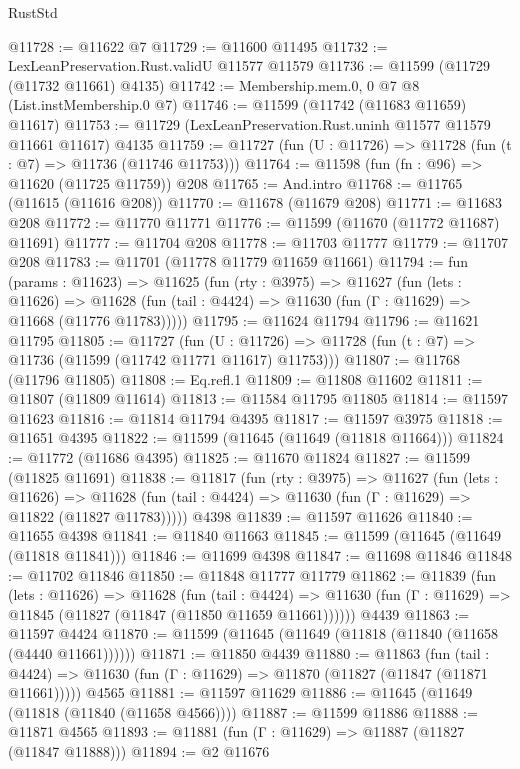 \begin{lexlean}{RustStd}
\begin{coremodule}
@11728 := @11622 @7
@11729 := @11600 @11495
@11732 := LexLeanPreservation.Rust.validU @11577 @11579
@11736 := @11599 (@11729 (@11732 @11661) @4135)
@11742 := Membership.mem.{0, 0} @7 @8 (List.instMembership.{0} @7)
@11746 := @11599 (@11742 (@11683 @11659) @11617)
@11753 := @11729 (LexLeanPreservation.Rust.uninh @11577 @11579 @11661 @11617) @4135
@11759 := @11727 (fun (U : @11726) => @11728 (fun (t : @7) => @11736 (@11746 @11753)))
@11764 := @11598 (fun (fn : @96) => @11620 (@11725 @11759)) @208
@11765 := And.intro
@11768 := @11765 (@11615 (@11616 @208))
@11770 := @11678 (@11679 @208)
@11771 := @11683 @208
@11772 := @11770 @11771
@11776 := @11599 (@11670 (@11772 @11687) @11691)
@11777 := @11704 @208
@11778 := @11703 @11777
@11779 := @11707 @208
@11783 := @11701 (@11778 @11779 @11659 @11661)
@11794 := fun (params : @11623) =>
  @11625
    (fun (rty : @3975) =>
    @11627
      (fun (lets : @11626) =>
      @11628 (fun (tail : @4424) => @11630 (fun (Γ : @11629) => @11668 (@11776 @11783)))))
@11795 := @11624 @11794
@11796 := @11621 @11795
@11805 := @11727
    (fun (U : @11726) => @11728 (fun (t : @7) => @11736 (@11599 (@11742 @11771 @11617) @11753)))
@11807 := @11768 (@11796 @11805)
@11808 := Eq.refl.{1}
@11809 := @11808 @11602
@11811 := @11807 (@11809 @11614)
@11813 := @11584 @11795 @11805
@11814 := @11597 @11623
@11816 := @11814 @11794 @4395
@11817 := @11597 @3975
@11818 := @11651 @4395
@11822 := @11599 (@11645 (@11649 (@11818 @11664)))
@11824 := @11772 (@11686 @4395)
@11825 := @11670 @11824
@11827 := @11599 (@11825 @11691)
@11838 := @11817
    (fun (rty : @3975) =>
    @11627
      (fun (lets : @11626) =>
      @11628 (fun (tail : @4424) => @11630 (fun (Γ : @11629) => @11822 (@11827 @11783)))))
    @4398
@11839 := @11597 @11626
@11840 := @11655 @4398
@11841 := @11840 @11663
@11845 := @11599 (@11645 (@11649 (@11818 @11841)))
@11846 := @11699 @4398
@11847 := @11698 @11846
@11848 := @11702 @11846
@11850 := @11848 @11777 @11779
@11862 := @11839
    (fun (lets : @11626) =>
    @11628
      (fun (tail : @4424) =>
      @11630 (fun (Γ : @11629) => @11845 (@11827 (@11847 (@11850 @11659 @11661))))))
    @4439
@11863 := @11597 @4424
@11870 := @11599 (@11645 (@11649 (@11818 (@11840 (@11658 (@4440 @11661))))))
@11871 := @11850 @4439
@11880 := @11863
    (fun (tail : @4424) => @11630 (fun (Γ : @11629) => @11870 (@11827 (@11847 (@11871 @11661)))))
    @4565
@11881 := @11597 @11629
@11886 := @11645 (@11649 (@11818 (@11840 (@11658 @4566))))
@11887 := @11599 @11886
@11888 := @11871 @4565
@11893 := @11881 (fun (Γ : @11629) => @11887 (@11827 (@11847 @11888)))
@11894 := @2 @11676

\end{coremodule}
\end{lexlean}

